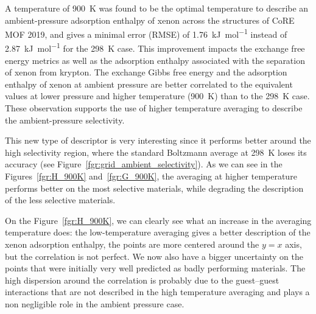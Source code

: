 \documentclass[main]{subfiles}
\begin{document}
A temperature of \SI{900}{\kelvin} was found to be the optimal temperature to describe an ambient-pressure adsorption enthalpy of xenon across the structures of CoRE MOF 2019, and gives a minimal error (RMSE) of \SI{1.76}{\kilo\joule\per\mole} instead of \SI{2.87}{\kilo\joule\per\mole} for the \SI{298}{\kelvin} case. This improvement impacts the exchange free energy metrics as well as the adsorption enthalpy associated with the separation of xenon from krypton. The exchange Gibbs free energy and the adsorption enthalpy of xenon at ambient pressure are better correlated to the equivalent values at lower pressure and higher temperature (\SI{900}{\kelvin}) than to the \SI{298}{\kelvin} case. These observation supports the use of higher temperature averaging to describe the ambient-pressure selectivity.

This new type of descriptor is very interesting since it performs better around the high selectivity region, where the standard Boltzmann average at \SI{298}{\kelvin} loses its accuracy (see Figure~\ref{fgr:grid_ambient_selectivity}). As we can see in the Figures~\ref{fgr:H_900K} and~\ref{fgr:G_900K}, the averaging at higher temperature performs better on the most selective materials, while degrading the description of the less selective materials.

On the Figure~\ref{fgr:H_900K}, we can clearly see what an increase in the averaging temperature does: the low-temperature averaging gives a better description of the xenon adsorption enthalpy, the points are more centered around the $y=x$ axis, but the correlation is not perfect. We now also have a bigger uncertainty on the points that were initially very well predicted as badly performing materials. The high dispersion around the correlation is probably due to the guest--guest interactions that are not described in the high temperature averaging and plays a non negligible role in the ambient pressure case.
\end{document}
